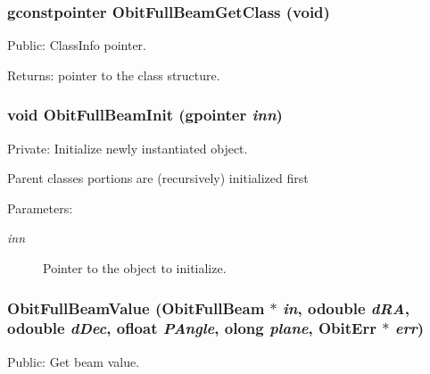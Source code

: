 \subsubsection{\setlength{\rightskip}{0pt plus 5cm}gconstpointer Obit\-Full\-Beam\-Get\-Class (void)}\label{ObitFullBeam_8c_a8}


Public: Class\-Info pointer. 

\begin{Desc}
\item[Returns:]pointer to the class structure. \end{Desc}
\subsubsection{\setlength{\rightskip}{0pt plus 5cm}void Obit\-Full\-Beam\-Init (gpointer {\em inn})}\label{ObitFullBeam_8c_a3}


Private: Initialize newly instantiated object. 

Parent classes portions are (recursively) initialized first \begin{Desc}
\item[Parameters:]
\begin{description}
\item[{\em inn}]Pointer to the object to initialize. \end{description}
\end{Desc}
\subsubsection{ Obit\-Full\-Beam\-Value ({\bf Obit\-Full\-Beam} $\ast$ {\em in}, {\bf odouble} {\em d\-RA}, {\bf odouble} {\em d\-Dec}, {\bf ofloat} {\em PAngle}, {\bf olong} {\em plane}, {\bf Obit\-Err} $\ast$ {\em err})}\label{ObitFullBeam_8c_a12}


Public: Get beam value. 

